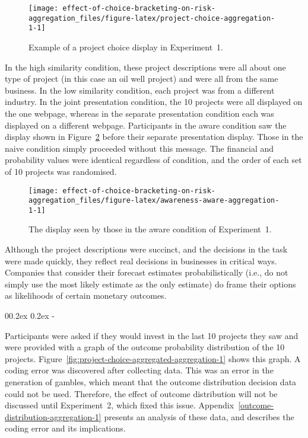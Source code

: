 \documentclass[
  english,
  man, donotrepeattitle,floatsintext]{apa7}
\makeatletter
\let\oldsubparagraph\subparagraph
\renewcommand{\subparagraph}[1]{\oldsubparagraph{#1}\mbox{}}
\renewcommand{\subparagraph}[1]{\@startsection{subparagraph}{5}{1em}%
  {0\baselineskip \@plus 0.2ex \@minus 0.2ex}%
  {-\z@\relax}%
  {\normalfont\normalsize\itshape\hspace{\parindent}{#1}\textit{\addperi}}{\relax}}
\theoremstyle{definition}
\theoremstyle{definition}
\theoremstyle{definition}
\theoremstyle{definition}
\theoremstyle{remark}
\makeatother
\begin{document}
\begin{figure}
\texttt{[image: effect-of-choice-bracketing-on-risk-aggregation\_files/figure-latex/project-choice-aggregation-1-1]} \caption{Example of a project choice display in Experiment~1.}\label{fig:project-choice-aggregation-1}
\end{figure}

In the high similarity condition, these project descriptions were all about one
type of project (in this case an oil well project) and were all from the same
business. In the low similarity condition, each project was from a different
industry. In the joint presentation condition, the 10 projects were all
displayed on the one webpage, whereas in the separate presentation condition
each was displayed on a different webpage. Participants in the aware condition
saw the display shown in Figure~\ref{fig:awareness-aware-aggregation-1} before
their separate presentation display. Those in the naive condition simply
proceeded without this message. The financial and probability values were
identical regardless of condition, and the order of each set of 10 projects was
randomised.



\begin{figure}
\texttt{[image: effect-of-choice-bracketing-on-risk-aggregation\_files/figure-latex/awareness-aware-aggregation-1-1]} \caption{The display seen by those in the aware condition of Experiment~1.}\label{fig:awareness-aware-aggregation-1}
\end{figure}

Although the project descriptions were succinct, and the decisions in the task
were made quickly, they reflect real decisions in businesses in critical ways.
Companies that consider their forecast estimates probabilistically (i.e., do not
simply use the most likely estimate as the only estimate) do frame their options
as likelihoods of certain monetary outcomes.

\hypertarget{outcome-distribution-materials-aggregation-1}{%
\subparagraph{Outcome Distribution Decision}\label{outcome-distribution-materials-aggregation-1}}

Participants were asked if they would invest in the last 10 projects they saw
and were provided with a graph of the outcome probability distribution of the 10
projects. Figure~\ref{fig:project-choice-aggregated-aggregation-1} shows this
graph. A coding error was discovered after collecting data. This was an error in
the generation of gambles, which meant that the outcome distribution decision
data could not be used. Therefore, the effect of outcome distribution will not
be discussed until Experiment~2, which fixed this issue.
Appendix~\ref{outcome-distribution-aggregation-1} presents an analysis of these
data, and describes the coding error and its implications.
\end{document}
